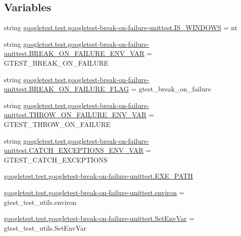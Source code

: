 \subsection*{Variables}
\begin{DoxyCompactItemize}
\item 
string \mbox{\hyperlink{namespacegoogletest_1_1test_1_1googletest-break-on-failure-unittest_a79d4cbe8ec7d7bca19a35d78436a5993}{googletest.\+test.\+googletest-\/break-\/on-\/failure-\/unittest.\+I\+S\+\_\+\+W\+I\+N\+D\+O\+WS}} = \textquotesingle{}nt\textquotesingle{}
\item 
string \mbox{\hyperlink{namespacegoogletest_1_1test_1_1googletest-break-on-failure-unittest_a2ad49bd3190b904f9d4c6abbcbc7d6ba}{googletest.\+test.\+googletest-\/break-\/on-\/failure-\/unittest.\+B\+R\+E\+A\+K\+\_\+\+O\+N\+\_\+\+F\+A\+I\+L\+U\+R\+E\+\_\+\+E\+N\+V\+\_\+\+V\+AR}} = \textquotesingle{}G\+T\+E\+S\+T\+\_\+\+B\+R\+E\+A\+K\+\_\+\+O\+N\+\_\+\+F\+A\+I\+L\+U\+RE\textquotesingle{}
\item 
string \mbox{\hyperlink{namespacegoogletest_1_1test_1_1googletest-break-on-failure-unittest_a8d5705c62837f9256c870037cd328b1d}{googletest.\+test.\+googletest-\/break-\/on-\/failure-\/unittest.\+B\+R\+E\+A\+K\+\_\+\+O\+N\+\_\+\+F\+A\+I\+L\+U\+R\+E\+\_\+\+F\+L\+AG}} = \textquotesingle{}gtest\+\_\+break\+\_\+on\+\_\+failure\textquotesingle{}
\item 
string \mbox{\hyperlink{namespacegoogletest_1_1test_1_1googletest-break-on-failure-unittest_aeb4b3bcf84c7cf8e5d35041e0f057350}{googletest.\+test.\+googletest-\/break-\/on-\/failure-\/unittest.\+T\+H\+R\+O\+W\+\_\+\+O\+N\+\_\+\+F\+A\+I\+L\+U\+R\+E\+\_\+\+E\+N\+V\+\_\+\+V\+AR}} = \textquotesingle{}G\+T\+E\+S\+T\+\_\+\+T\+H\+R\+O\+W\+\_\+\+O\+N\+\_\+\+F\+A\+I\+L\+U\+RE\textquotesingle{}
\item 
string \mbox{\hyperlink{namespacegoogletest_1_1test_1_1googletest-break-on-failure-unittest_a5024efcf3860e49f674f65f225184b66}{googletest.\+test.\+googletest-\/break-\/on-\/failure-\/unittest.\+C\+A\+T\+C\+H\+\_\+\+E\+X\+C\+E\+P\+T\+I\+O\+N\+S\+\_\+\+E\+N\+V\+\_\+\+V\+AR}} = \textquotesingle{}G\+T\+E\+S\+T\+\_\+\+C\+A\+T\+C\+H\+\_\+\+E\+X\+C\+E\+P\+T\+I\+O\+NS\textquotesingle{}
\item 
\mbox{\hyperlink{namespacegoogletest_1_1test_1_1googletest-break-on-failure-unittest_a2f30a841589404516250336e48952e59}{googletest.\+test.\+googletest-\/break-\/on-\/failure-\/unittest.\+E\+X\+E\+\_\+\+P\+A\+TH}}
\item 
\mbox{\hyperlink{namespacegoogletest_1_1test_1_1googletest-break-on-failure-unittest_a70e290c3024fb20151e901d98e819a77}{googletest.\+test.\+googletest-\/break-\/on-\/failure-\/unittest.\+environ}} = gtest\+\_\+test\+\_\+utils.\+environ
\item 
\mbox{\hyperlink{namespacegoogletest_1_1test_1_1googletest-break-on-failure-unittest_a17f1e9976fa9cd12a20539297b844088}{googletest.\+test.\+googletest-\/break-\/on-\/failure-\/unittest.\+Set\+Env\+Var}} = gtest\+\_\+test\+\_\+utils.\+Set\+Env\+Var
\end{DoxyCompactItemize}
